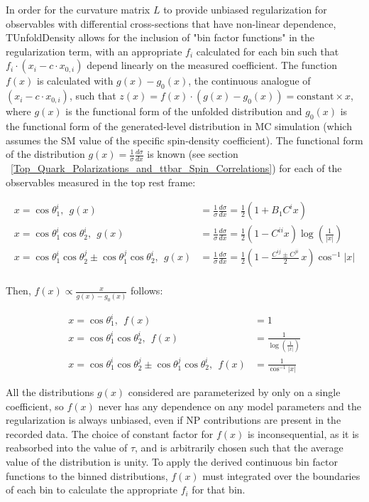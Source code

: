 In order for the curvature matrix $L$ to provide unbiased regularization for observables with differential cross-sections that have non-linear dependence, TUnfoldDensity allows for the inclusion of "bin factor functions" in the regularization term, with an appropriate $f_i$ calculated for each bin such that $f_i \cdot (x_i - c \cdot x_{0,i})$ depend linearly on the measured coefficient. 
The function $f(x)$ is calculated with $g(x) - g_{0}(x)$, the continuous analogue of $(x_i - c \cdot x_{0,i})$, such that $z(x) = f(x) \cdot (g(x) - g_{0}(x)) = \mathrm{constant} \times x$, where $g(x)$ is the functional form of the unfolded distribution and $g_{0}(x)$ is the functional form of the generated-level distribution in MC simulation (which assumes the SM value of the specific spin-density coefficient).
The functional form of the distribution $g(x) = \tfrac{1}{\sigma}\tfrac{d\sigma}{dx}$ is known (see section ~\ref{Top_Quark_Polarizations_and_ttbar_Spin_Correlations}) for each of the observables measured in the top rest frame:
\begin{linenomath*}
\begin{align}
x=\cos\theta_1^i, \:\: g(x) &= \frac{1}{\sigma}\frac{d\sigma}{dx} = \frac{1}{2} (1+B_1C^{i} x) \\ 
x=\cos\theta_1^i\cos\theta_2^i, \:\: g(x) &= \frac{1}{\sigma}\frac{d\sigma}{dx} = \frac{1}{2} (1-C^{ii} x) \log \left(\frac{1}{\left \vert x \right \vert }\right) \\ 
x=\cos\theta_1^i\cos\theta_2^j\pm \cos\theta_1^j\cos\theta_2^i, \:\: g(x) &= \frac{1}{\sigma}\frac{d\sigma}{dx} = \frac{1}{2} \left( 1 - \frac{C^{ij} \pm C^{ji}}{2} \, x \right)  \cos ^{-1}\left \vert x \right \vert \\
\end{align}
\end{linenomath*}
Then, $f(x) \propto \frac{x}{g(x)-g_{0}(x)}$ follows:
\begin{linenomath*}
\begin{align}
x=\cos\theta_1^i, \:\: f(x) &= 1 \\
x=\cos\theta_1^i\cos\theta_2^i, \:\: f(x) &= \frac{1}{\log \left(\frac{1}{\left\vert x \right \vert }\right)} \\
x=\cos\theta_1^i\cos\theta_2^j\pm \cos\theta_1^j\cos\theta_2^i, \:\: f(x) &=  \frac{1}{\cos ^{-1}\left \vert x \right \vert}
\end{align}
\end{linenomath*}
All the distributions $g(x)$ considered are parameterized by only on a single coefficient, so $f(x)$ never has any dependence on any model parameters and the regularization is always unbiased, even if NP contributions are present in the recorded data. 
The choice of constant factor for $f(x)$ is inconsequential, as it is reabsorbed into the value of $\tau$, and is arbitrarily chosen such that the average value of the distribution is unity.
To apply the derived continuous bin factor functions to the binned distributions, $f(x)$ must integrated over the boundaries of each bin to calculate the appropriate $f_i$ for that bin. 

